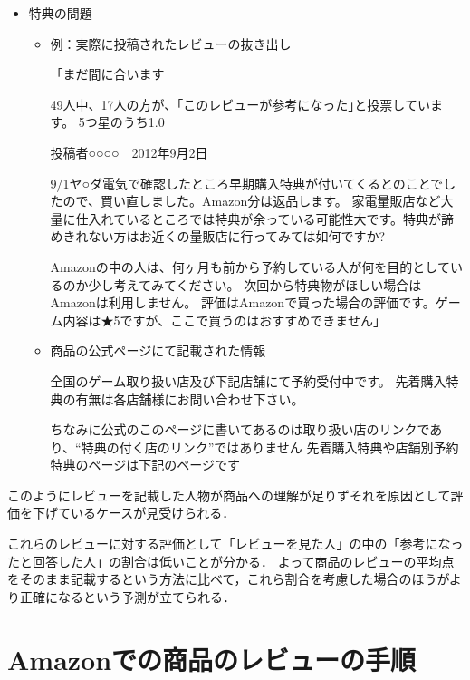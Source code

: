 \begin{itemize}


 \item	特典の問題


\begin{itemize}
\setlength{\parskip}{3mm}


 \item	例：実際に投稿されたレビューの抜き出し

「まだ間に合います


49人中、17人の方が、｢このレビューが参考になった｣と投票しています。
5つ星のうち1.0

投稿者○○○○　2012年9月2日

9/1ヤ○ダ電気で確認したところ早期購入特典が付いてくるとのことでしたので、買い直しました。Amazon分は返品します。
家電量販店など大量に仕入れているところでは特典が余っている可能性大です。特典が諦めきれない方はお近くの量販店に行ってみては如何ですか?

Amazonの中の人は、何ヶ月も前から予約している人が何を目的としているのか少し考えてみてください。
次回から特典物がほしい場合はAmazonは利用しません。
評価はAmazonで買った場合の評価です。ゲーム内容は★5ですが、ここで買うのはおすすめできません」


 \item	商品の公式ページにて記載された情報

全国のゲーム取り扱い店及び下記店舗にて予約受付中です。
先着購入特典の有無は各店舗様にお問い合わせ下さい。

ちなみに公式のこのページに書いてあるのは取り扱い店のリンクであり、“特典の付く店のリンク”ではありません
先着購入特典や店舗別予約特典のページは下記のページです



\end{itemize}


\end{itemize}

このようにレビューを記載した人物が商品への理解が足りずそれを原因として評価を下げているケースが見受けられる．

これらのレビューに対する評価として「レビューを見た人」の中の「参考になったと回答した人」の割合は低いことが分かる．
よって商品のレビューの平均点をそのまま記載するという方法に比べて，これら割合を考慮した場合のほうがより正確になるという予測が立てられる．




\clearpage



\section{Amazonでの商品のレビューの手順}

